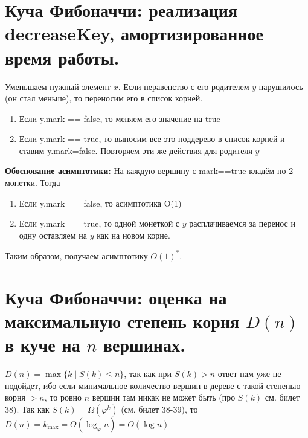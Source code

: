 \section{Куча Фибоначчи: реализация decreaseKey, амортизированное время работы.}
\par Уменьшаем нужный элемент $x$. Если неравенство с его родителем $y$ нарушилось (он стал меньше), то переносим его в список корней.
\begin{enumerate}
    \item Если y.mark == false, то меняем его значение на true
    \item Если y.mark == true, то выносим все это поддерево в список корней и ставим y.mark=false. Повторяем эти же действия для родителя $y$
\end{enumerate}

\par \textbf{Обоснование асимптотики:} На каждую вершину с mark==true кладём по 2 монетки. Тогда
\begin{enumerate}
    \item Если y.mark == false, то асимптотика O(1)
    \item Если y.mark == true, то одной монеткой с $y$ расплачиваемся за перенос и одну оставляем на $y$ как на новом корне.
\end{enumerate}
\par Таким образом, получаем асимптотику $O(1)^*$.

\setcounter{section}{36}
\section{Куча Фибоначчи: оценка на максимальную степень корня $D(n)$ в куче на $n$ вершинах.}
\par $D(n)=\max \{k \; | \; S(k) \leqslant n\}$, так как при $S(k)>n$ ответ нам уже не подойдет, ибо если минимальное количество вершин в дереве с такой степенью корня $>n$, то ровно $n$ вершин там никак не может быть (про $S(k)$ см. билет 38). Так как $S(k)=\Omega(\varphi^k)$ (см. билет 38-39), то $D(n)=k_{\max} =O(\log_\varphi n)=O(\log n)$


\setcounter{section}{37}
